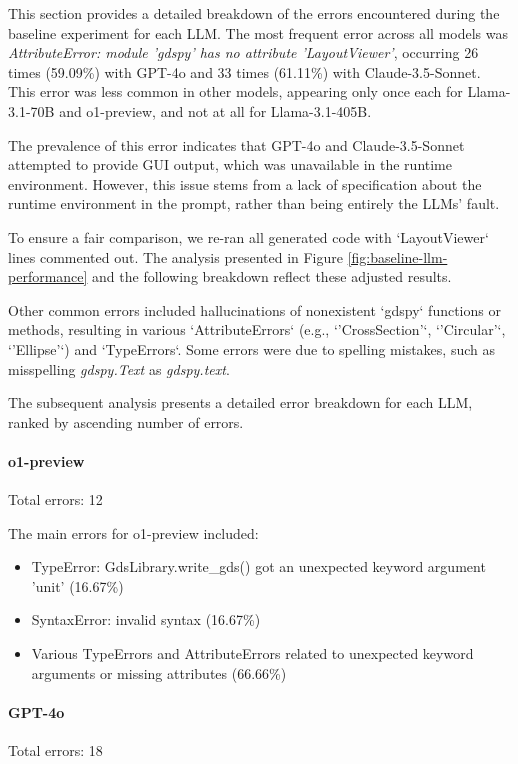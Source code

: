 \documentclass{article}
\begin{document}
This section provides a detailed breakdown of the errors encountered during the baseline experiment for each LLM. The most frequent error across all models was \textit{AttributeError: module 'gdspy' has no attribute 'LayoutViewer'}, occurring 26 times (59.09\%) with GPT-4o and 33 times (61.11\%) with Claude-3.5-Sonnet. This error was less common in other models, appearing only once each for Llama-3.1-70B and o1-preview, and not at all for Llama-3.1-405B.

The prevalence of this error indicates that GPT-4o and Claude-3.5-Sonnet attempted to provide GUI output, which was unavailable in the runtime environment. However, this issue stems from a lack of specification about the runtime environment in the prompt, rather than being entirely the LLMs' fault.

To ensure a fair comparison, we re-ran all generated code with `LayoutViewer` lines commented out. The analysis presented in Figure \ref{fig:baseline-llm-performance} and the following breakdown reflect these adjusted results.

Other common errors included hallucinations of nonexistent `gdspy` functions or methods, resulting in various `AttributeErrors` (e.g., `'CrossSection'`, `'Circular'`, `'Ellipse'`) and `TypeErrors`. Some errors were due to spelling mistakes, such as misspelling \textit{gdspy.Text} as \textit{gdspy.text}.

The subsequent analysis presents a detailed error breakdown for each LLM, ranked by ascending number of errors.

\paragraph{o1-preview}
Total errors: 12

The main errors for o1-preview included:
\begin{itemize}
    \item TypeError: GdsLibrary.write\_gds() got an unexpected keyword argument 'unit' (16.67\%)
    \item SyntaxError: invalid syntax (16.67\%)
    \item Various TypeErrors and AttributeErrors related to unexpected keyword arguments or missing attributes (66.66\%)
\end{itemize}

\paragraph{GPT-4o}
Total errors: 18
\end{document}

